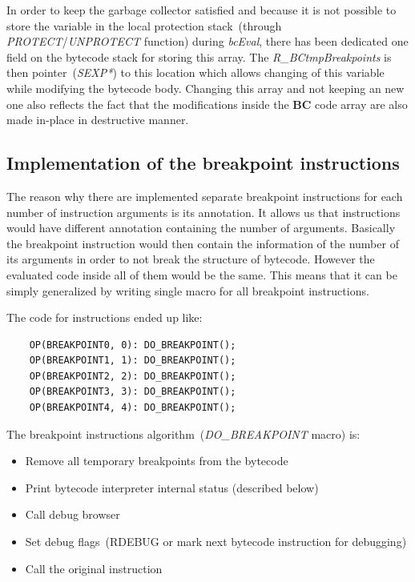 \documentclass[thesis=M,english]{FITthesis}[2018/10/20]
\begin{document}
In order to keep the garbage collector satisfied and because it is not possible to store the variable in the local protection stack~(through \textit{PROTECT}/\textit{UNPROTECT} function) during \textit{bcEval}, there has been dedicated one field on the bytecode stack for storing this array. The \textit{R{\_}BCtmpBreakpoints} is then pointer~(\textit{SEXP*}) to this location which allows changing of this variable while modifying the bytecode body. Changing this array and not keeping an new one also reflects the fact that the modifications inside the \textbf{BC} code array are also made in-place in destructive manner.

\subsection{Implementation of the breakpoint instructions}\label{implementation-of-breakpoint-instruction}

The reason why there are implemented separate breakpoint instructions for each number of instruction arguments is its annotation. It allows us that instructions would have different annotation containing the number of arguments. Basically the breakpoint instruction would then contain the information of the number of its arguments in order to not break the structure of bytecode. However the evaluated code inside all of them would be the same. This means that it can be simply generalized by writing single macro for all breakpoint instructions.

The code for instructions ended up like:

\begin{lstlisting}
    OP(BREAKPOINT0, 0): DO_BREAKPOINT();
    OP(BREAKPOINT1, 1): DO_BREAKPOINT();
    OP(BREAKPOINT2, 2): DO_BREAKPOINT();
    OP(BREAKPOINT3, 3): DO_BREAKPOINT();
    OP(BREAKPOINT4, 4): DO_BREAKPOINT();
\end{lstlisting}

The breakpoint instructions algorithm~(\textit{DO{\_}BREAKPOINT} macro) is:

\begin{itemize}
	\item Remove all temporary breakpoints from the bytecode
	\item Print bytecode interpreter internal status (described below)
	\item Call debug browser
	\item Set debug flags~(RDEBUG or mark next bytecode instruction for debugging)
	\item Call the original instruction
\end{itemize}
\end{document}

